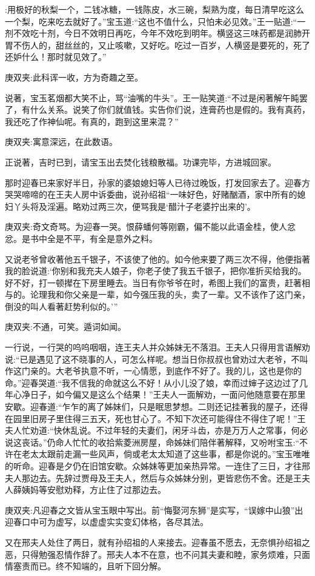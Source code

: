 \begin{parag}
:用极好的秋梨一个，二钱冰糖，一钱陈皮，水三碗，梨熟为度，每日清早吃这么一个梨，吃来吃去就好了。”宝玉道:“这也不值什么，只怕未必见效。”王一贴道:“一剂不效吃十剂，今日不效明日再吃，今年不效吃到明年。横竖这三味药都是润肺开胃不伤人的，甜丝丝的，又止咳嗽，又好吃。吃过一百岁，人横竖是要死的，死了还妒什么！那时就见效了。”\begin{note}庚双夹:此科诨一收，方为奇趣之至。\end{note}说著，宝玉茗烟都大笑不止，骂“油嘴的牛头”。王一贴笑道:“不过是闲著解午盹罢了，有什么关系。说笑了你们就值钱。实告你们说，连膏药也是假的。我有真药，我还吃了作神仙呢。有真的，跑到这里来混？”\begin{note}庚双夹:寓意深远，在此数语。\end{note}正说著，吉时已到，请宝玉出去焚化钱粮散福。功课完毕，方进城回家。
\end{parag}


\begin{parag}
    那时迎春已来家好半日，孙家的婆娘媳妇等人已待过晚饭，打发回家去了。迎春方哭哭啼啼的在王夫人房中诉委曲，说孙绍祖“一味好色，好赌酗酒，家中所有的媳妇丫头将及淫遍。略劝过两三次，便骂我是‘醋汁子老婆拧出来的’。\begin{note}庚双夹:奇文奇骂。为迎春一哭。恨薛蟠何等刚霸，偏不能以此语金桂，使人忿忿。是书中全是不平，有全是意外之料。\end{note}又说老爷曾收著他五千银子，不该使了他的。如今他来要了两三次不得，他便指著我的脸说道:‘你别和我充夫人娘子，你老子使了我五千银子，把你准折买给我的。好不好，打一顿撵在下房里睡去。当日有你爷爷在时，希图上我们的富贵，赶著相与的。论理我和你父亲是一辈，如今强压我的头，卖了一辈。又不该作了这门亲，倒没的叫人看著赶势利似的。’”\begin{note}庚双夹:不通，可笑。遁词如闻。\end{note}一行说，一行哭的呜呜咽咽，连王夫人并众姊妹无不落泪。王夫人只得用言语解劝说:“已是遇见了这不晓事的人，可怎么样呢。想当日你叔叔也曾劝过大老爷，不叫作这门亲的。大老爷执意不听，一心情愿，到底作不好了。我的儿，这也是你的命。”迎春哭道:“我不信我的命就这么不好！从小儿没了娘，幸而过婶子这边过了几年心净日子，如今偏又是这么个结果！”王夫人一面解劝，一面问他随意要在那里安歇。迎春道:“乍乍的离了姊妹们，只是眠思梦想。二则还记挂著我的屋子，还得在园里旧房子里住得三五天，死也甘心了。不知下次还可能得住不得住了呢！”王夫人忙劝道:“快休乱说。不过年轻的夫妻们，闲牙斗齿，亦是万万人之常事，何必说这丧话。”仍命人忙忙的收拾紫菱洲房屋，命姊妹们陪伴著解释，又吩咐宝玉:“不许在老太太跟前走漏一些风声，倘或老太太知道了这些事，都是你说的。”宝玉唯唯的听命。迎春是夕仍在旧馆安歇。众姊妹等更加亲热异常。一连住了三日，才往邢夫人那边去。先辞过贾母及王夫人，然后与众姊妹分别，更皆悲伤不舍。还是王夫人薛姨妈等安慰劝释，方止住了过那边去。\begin{note}庚双夹:凡迎春之文皆从宝玉眼中写出。前“悔娶河东狮”是实写，“误嫁中山狼”出迎春口中可为虚写，以虚虚实实变幻体格，各尽其法。\end{note}又在邢夫人处住了两日，就有孙绍祖的人来接去。迎春虽不愿去，无奈惧孙绍祖之恶，只得勉强忍情作辞了。邢夫人本不在意，也不问其夫妻和睦，家务烦难，只面情塞责而已。终不知端的，且听下回分解。
\end{parag}


